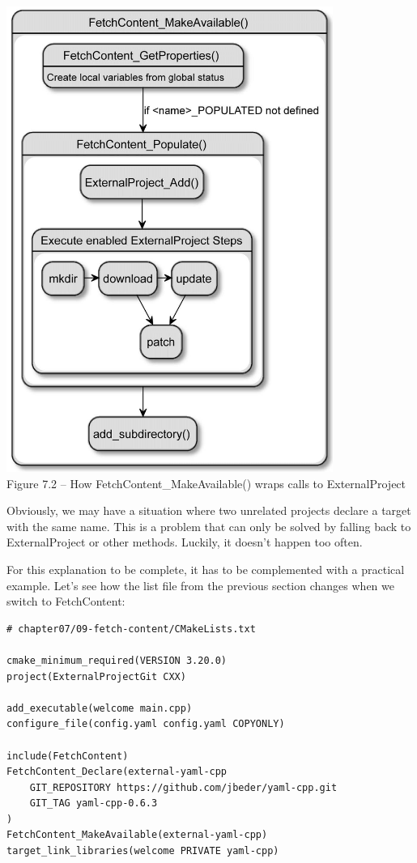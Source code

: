\begin{center}
\includegraphics[width=0.8\textwidth]{content/2/chapter7/images/2.jpg}\\
Figure 7.2 – How FetchContent\_MakeAvailable() wraps calls to ExternalProject
\end{center}

Obviously, we may have a situation where two unrelated projects declare a target with the same name. This is a problem that can only be solved by falling back to ExternalProject or other methods. Luckily, it doesn't happen too often.

For this explanation to be complete, it has to be complemented with a practical example. Let's see how the list file from the previous section changes when we switch to FetchContent:

\begin{lstlisting}[style=styleCMake]
# chapter07/09-fetch-content/CMakeLists.txt

cmake_minimum_required(VERSION 3.20.0)
project(ExternalProjectGit CXX)

add_executable(welcome main.cpp)
configure_file(config.yaml config.yaml COPYONLY)

include(FetchContent)
FetchContent_Declare(external-yaml-cpp
	GIT_REPOSITORY https://github.com/jbeder/yaml-cpp.git
	GIT_TAG yaml-cpp-0.6.3
)
FetchContent_MakeAvailable(external-yaml-cpp)
target_link_libraries(welcome PRIVATE yaml-cpp)
\end{lstlisting} 

